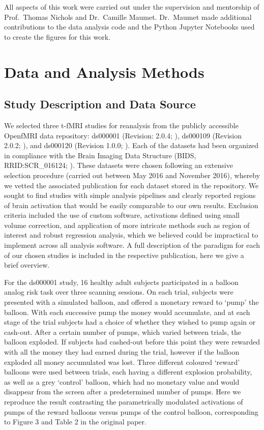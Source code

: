 All aspects of this work were carried out under the supervision and mentorship of Prof.\ Thomas Nichols and Dr.\ Camille Maumet. Dr.\ Maumet made additional contributions to the data analysis code and the Python Jupyter Notebooks used to create the figures for this work.

\pagebreak

\section{Data and Analysis Methods}

\subsection{Study Description and Data Source}
We selected three t-fMRI studies for reanalysis from the publicly accessible OpenfMRI data repository: ds000001 (Revision: 2.0.4; \citep{Schonberg2012-oo}), ds000109 (Revision 2.0.2; \citep{Moran2012-cw}), and ds000120 (Revision 1.0.0; \citep{Padmanabhan2011-dc}). Each of the datasets had been organized in compliance with the Brain Imaging Data Structure (BIDS, RRID:SCR\_016124; \citep{Gorgolewski2016-nf}). These datasets were chosen following an extensive selection procedure (carried out between May 2016 and November 2016), whereby we vetted the associated publication for each dataset stored in the repository. We sought to find studies with simple analysis pipelines and clearly reported regions of brain activation that would be easily comparable to our own results. Exclusion criteria included the use of custom software, activations defined using small volume correction, and application of more intricate methods such as region of interest and robust regression analysis, which we believed could be impractical to implement across all analysis software. A full description of the paradigm for each of our chosen studies is included in the respective publication, here we give a brief overview. 

For the ds000001 study, 16 healthy adult subjects participated in a balloon analog risk task over three scanning sessions. On each trial, subjects were presented with a simulated balloon, and offered a monetary reward to `pump' the balloon. With each successive pump the money would accumulate, and at each stage of the trial subjects had a choice of whether they wished to pump again or cash-out. After a certain number of pumps, which varied between trials, the balloon exploded. If subjects had cashed-out before this point they were rewarded with all the money they had earned during the trial, however if the balloon exploded all money accumulated was lost. Three different coloured `reward' balloons were used between trials, each having a different explosion probability, as well as a grey `control' balloon, which had no monetary value and would disappear from the screen after a predetermined number of pumps. Here we reproduce the result contrasting the parametrically modulated activations of pumps of the reward balloons versus pumps of the control balloon, corresponding to Figure 3 and Table 2 in the original paper.

